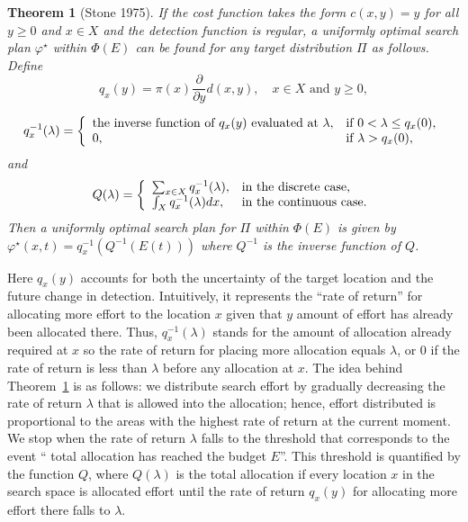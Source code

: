 \documentclass[12pt]{article}
\newtheorem{theorem}{Theorem}[section]
\theoremstyle{plain}
\theoremstyle{definition}
\theoremstyle{remark}
\begin{document}
\begin{theorem}[Stone 1975]
\label{thm:unifopt}
If the cost function takes the form $c(x,y)=y$ for all $y\geq 0$ and $x\in X$ and the detection function is regular,  a uniformly optimal search plan $\varphi^\star$ within $\Phi(E)$ can be found for any target distribution $\Pi$ as follows.  Define
\begin{equation}
\label{eq:rate}
q_x (y)=\pi(x)\frac{\partial }{\partial y}d(x, y), \quad x\in X \text{ and $y\geq 0$},
\end{equation}

\begin{equation}
q^{-1}_x(\lambda)=\left\{
		                           \begin{array}{ll}
		                           \text{the inverse function of $q_x(y)$  evaluated at $\lambda$},& \hbox{if $0<\lambda\leq q_x(0)$,} \\
					0, & \hbox{if $\lambda>q_x(0)$,} 
		                          \end{array}
		                         \right.
\end{equation}		                       
and 
\begin{equation}
Q(\lambda)= \left\{
		                           \begin{array}{ll}
		                          \sum_{x\in X} q_x^{-1}(\lambda),  & \hbox{in the discrete case,} \\
					 \int_X q_x^{-1}(\lambda)dx,  & \hbox{in the continuous case.} 
		                          \end{array}
		                         \right.
\end{equation}
Then a uniformly optimal search plan for $\Pi$ within  $\Phi(E)$ is given by $\varphi^\star(x, t)=q_x^{-1}(Q^{-1}(E(t)))$ where $Q^{-1}$ is the inverse function of $Q$. 
\end{theorem}
Here $q_x(y)$ accounts for both the uncertainty of the target location and the future change in detection.  Intuitively,  it represents the ``rate of return'' for allocating more effort to the location $x$ given that $y$ amount of effort has already been allocated there.  Thus,  $q^{-1}_x(\lambda)$ stands for the amount of allocation already required at $x$ so the rate of return for placing more allocation equals $\lambda$, or $0$ if the rate of return is less than $\lambda$ before any allocation at $x$. The idea behind Theorem~\ref{thm:unifopt} is as follows: we distribute search effort by gradually decreasing the rate of return $\lambda$ that is allowed into the allocation; hence,  effort distributed is proportional to the areas with the highest rate of return at the current moment.  We stop when the rate of return $\lambda$ falls to the threshold that corresponds to the event `` total allocation has reached the budget $E$''.  This threshold is quantified by the function $Q$, where $Q(\lambda)$ is the total allocation if every location $x$ in the search space is allocated effort until the rate of return $q_x(y)$ for allocating more effort there falls to $\lambda$. 
\end{document}
